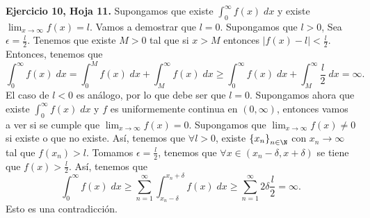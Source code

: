 \begin{eg}
\normalfont \textbf{Ejercicio 10, Hoja 11.} Supongamos que existe $\displaystyle \int^{\infty}_{0} f\left(x\right) \; dx $ y existe $\displaystyle \lim_{x \to \infty}f\left(x\right) = l $. Vamos a demostrar que $\displaystyle l = 0 $. Supongamos que $\displaystyle l > 0 $, Sea $\displaystyle \epsilon = \frac{l}{2} $. Tenemos que existe $\displaystyle M > 0 $ tal que si $\displaystyle x > M $ entonces $\displaystyle \left|f\left(x\right)-l\right| < \frac{l }{2} $. Entonces, tenemos que
\[\int^{\infty}_{0} f\left(x\right) \; dx = \int^{M}_{0} f\left(x\right) \; dx + \int^{\infty}_{M} f\left(x\right) \; dx \geq \int^{\infty}_{0} f\left(x\right) \; dx + \int^{\infty}_{M} \frac{l}{2} \; dx = \infty .\]
El caso de $\displaystyle l < 0 $ es análogo, por lo que debe ser que $\displaystyle l = 0 $. Supongamos ahora que existe $\displaystyle \int^{\infty}_{0} f\left(x\right) \; dx $ y $\displaystyle f $ es uniformemente continua en $\displaystyle \left(0,\infty\right) $, entonces vamos a ver si se cumple que $\displaystyle \lim_{x \to \infty}f\left(x\right) =0 $. Supongamos que $\displaystyle \lim_{x \to \infty}f\left(x\right) \neq 0 $ si existe o que no existe. Así, tenemos que $\displaystyle \forall l > 0 $, existe $\displaystyle \left\{ x_{n}\right\} _{n\in\N} $ con $\displaystyle x_{n}\to \infty $ tal que $\displaystyle f\left(x_{n}\right) > l $.
Tomamos $\displaystyle \epsilon = \frac{l}{2} $, tenemos que $\displaystyle \forall x \in \left(x_{n}-\delta, x + \delta \right) $ se tiene que $\displaystyle f\left(x\right) > \frac{l}{2} $. Así, tenemos que 
\[\int^{\infty}_{0} f\left(x\right) \; dx \geq \sum^{\infty}_{n=1}\int^{x_{n}+\delta }_{x_{n}-\delta } f\left(x\right) \; dx \geq \sum^{\infty}_{n =1}2\delta \frac{l}{2} = \infty .\]
Esto es una contradicción.
\end{eg}
